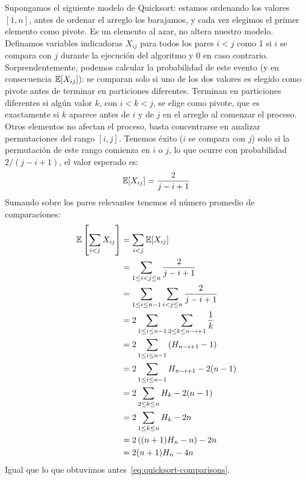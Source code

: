   Supongamos el siguiente modelo de Quicksort:
  estamos ordenando los valores \([1, n]\),
  antes de ordenar el arreglo los barajamos,
  y cada vez elegimos el primer elemento como pivote.
  Es un elemento al azar,
  no altera nuestro modelo.
  Definamos variables indicadoras \(X_{i j}\) para todos los pares \(i < j\)
  como \num{1} si \(i\) se compara con \(j\) durante la ejecución del algoritmo
  y \num{0} en caso contrario.
  Sorprendentemente,
  podemos calcular la probabilidad de este evento
  (y en consecuencia \(\operatorname{\mathbb{E}}[X_{i j}]\)):
  se comparan solo si uno de los dos valores es elegido como pivote
  antes de terminar en particiones diferentes.
  Terminan en particiones diferentes si algún valor \(k\),
  con \(i < k < j\),
  se elige como pivote,
  que es exactamente si \(k\) aparece antes de \(i\) y de \(j\) en el arreglo
  al comenzar el proceso.
  Otros elementos no afectan el proceso,
  basta concentrarse en analizar permutaciones del rango \([i, j]\).
  Tenemos éxito
  (\(i\) se compara con \(j\))
  solo si la permutación de este rango comienza en \(i\) o \(j\),
  lo que ocurre con probabilidad \(2 / (j - i + 1)\),
  el valor esperado es:
  \begin{equation*}
    \operatorname{\mathbb{E}}[X_{i j}]
       = \frac{2}{j - i + 1}
  \end{equation*}
  Sumando sobre los pares relevantes
  tenemos el número promedio de comparaciones:
  \begin{align*}
    \operatorname{\mathbb{E}}\left[ \sum_{i < j} X_{i j} \right]
      &= \sum_{i < j} \operatorname{\mathbb{E}}[X_{i j}] \\
      &= \sum_{1 \le i < j \le n} \frac{2}{j - i + 1} \\
      &= \sum_{1 \le i \le n - 1} \sum_{i < j \le n} \frac{2}{j - i + 1} \\
      &= 2 \sum_{1 \le i \le n - 1}
             \sum_{2 \le k \le n - i + 1} \frac{1}{k} \\
      &= 2 \sum_{1 \le i \le n - 1}
             \left( H_{n - i + 1} - 1 \right) \\
      &= 2 \sum_{1 \le i \le n - 1} H_{n - i + 1} - 2 (n - 1) \\
      &= 2 \sum_{2 \le k \le n} H_k - 2 (n - 1) \\
      &= 2 \sum_{1 \le k \le n} H_k - 2 n \\
      &= 2 \left( (n + 1) H_n - n \right) - 2 n \\
      &= 2 (n + 1) H_n - 4 n
  \end{align*}
  Igual que lo que obtuvimos antes~\eqref{eq:quicksort-comparisons}.


